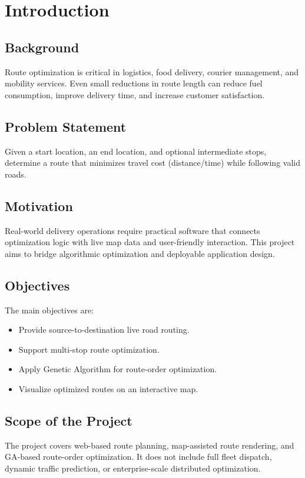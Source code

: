\documentclass[12pt,a4paper]{report}
\begin{document}
\chapter{Introduction}

\section{Background}
Route optimization is critical in logistics, food delivery, courier management, and mobility services. Even small reductions in route length can reduce fuel consumption, improve delivery time, and increase customer satisfaction.

\section{Problem Statement}
Given a start location, an end location, and optional intermediate stops, determine a route that minimizes travel cost (distance/time) while following valid roads.

\section{Motivation}
Real-world delivery operations require practical software that connects optimization logic with live map data and user-friendly interaction. This project aims to bridge algorithmic optimization and deployable application design.

\section{Objectives}
The main objectives are:
\begin{itemize}
    \item Provide source-to-destination live road routing.
    \item Support multi-stop route optimization.
    \item Apply Genetic Algorithm for route-order optimization.
    \item Visualize optimized routes on an interactive map.
\end{itemize}

\section{Scope of the Project}
The project covers web-based route planning, map-assisted route rendering, and GA-based route-order optimization. It does not include full fleet dispatch, dynamic traffic prediction, or enterprise-scale distributed optimization.
\end{document}
